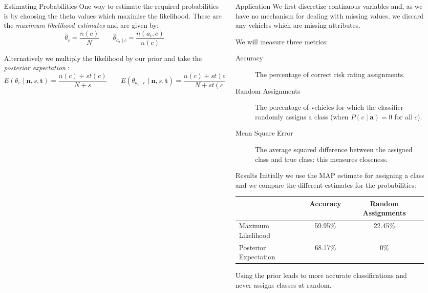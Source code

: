 \documentclass{beamer}
\newcommand{\defn}[1]{\textit{\color{ETH10}#1}}
\begin{document}
\begin{frame}
\begin{columns}
\begin{column}{0.38\paperwidth}
		\begin{block}{Estimating Probabilities}
			One way to estimate the required probabilities is by choosing the theta values which maximise the likelihood.
			These are the \defn{maximum likelihood estimates} and are given by:
			\begin{equation}\label{mles}
				\hat{\theta}_c = \frac{n(c)}{N} \qquad
				\hat{\theta}_{a_i \mid c} = \frac{n(a_i, c)}{n(c)}
			\end{equation}\vspace{0.5em}

			Alternatively we multiply the likelihood by our prior and take the \defn{posterior expectation} \cite{Zaffalon01}:
			\begin{equation}
				E(\theta_c \mid \mathbf{n},s,\mathbf{t}) = \frac{n(c) + st(c)}{N + s} \qquad E(\theta_{a_i \mid c} \mid \mathbf{n},s,\mathbf{t}) = \frac{n(c) + st(a_i, c)}{N + st(c)}
			\end{equation}
		\end{block}

		
	\end{column}

	\begin{column}{0.25\paperwidth}

		\begin{block}{Application}
			We first discretize continuous variables and, as we have no mechanism for dealing with missing values, we discard any vehicles which are missing attributes.\vspace{0.5em}

			We will measure three metrics:
			\begin{description}
				\item[Accuracy] The percentage of correct risk rating assignments.
				\item[Random Assignments] The percentage of vehicles for which the classifier randomly assigns a class (when $P(c \mid \mathbf{a}) = 0$ for all $c$).
				\item[Mean Square Error] The average squared difference between the assigned class and true class; this measures closeness.
			\end{description}\vspace{0.5em}
		\end{block}

		\begin{block}{Results}
			Initially we use the MAP estimate for assigning a class and we compare the different estimates for the probabilities:
			\begin{center}
				\begin{tabular}{ l|c c }
					                      & Accuracy & Random Assignments\\
					\hline
					Maximum Likelihood    & 59.95\%  & 22.45\% \\
					Posterior Expectation & 68.17\%  & 0\%
				\end{tabular}
			\end{center}
			Using the prior leads to more accurate classifications and never assigns classes at random.


\end{block}
\end{column}
\end{columns}
\end{frame}
\end{document}
